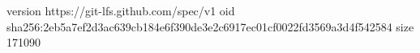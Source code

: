version https://git-lfs.github.com/spec/v1
oid sha256:2eb5a7ef2d3ac639cb184e6f390de3e2c6917ec01cf0022fd3569a3d4f542584
size 171090
